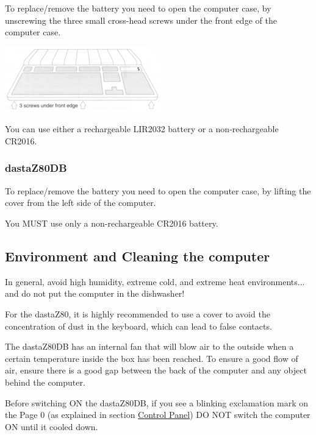         To replace/remove the battery you need to open the computer case, by
        unscrewing the three small cross-head screws under the front edge of
        the computer case.

        \centerline{\includegraphics[scale=1]{images/keyboardscrews.png}}

        You can use either a rechargeable LIR2032 battery or a non-rechargeable
        CR2016.

        \subsubsection{dastaZ80DB}

        To replace/remove the battery you need to open the computer case, by
        lifting the cover from the left side of the computer.

        You MUST use only a non-rechargeable CR2016 battery.

    \subsection{Environment and Cleaning the computer}

    In general, avoid high humidity, extreme cold, and extreme heat
    environments... and do not put the computer in the dishwasher!

    For the dastaZ80, it is highly recommended to use a cover to avoid the
    concentration of dust in the keyboard, which can lead to false contacts.

    The dastaZ80DB has an internal fan that will blow air to the outside when a
    certain temperature inside the box has been reached. To ensure a good flow
    of air, ensure there is a good gap between the back of the computer and any
    object behind the computer.

    Before switching ON the dastaZ80DB, if you see a blinking exclamation mark
    on the Page 0 (as explained in section \hyperref[subsubsec:controlpanel]
    {Control Panel}) DO NOT switch the computer ON until it cooled down.